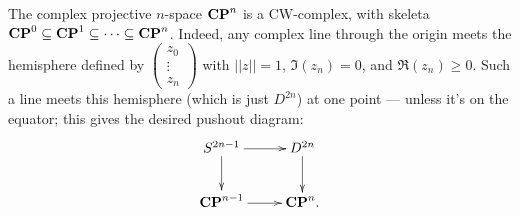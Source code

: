 \begin{example}
    The complex projective $n$-space $\mathbf{CP}^n$ is a CW-complex, with skeleta $\mathbf{CP}^0\subseteq\mathbf{CP}^1\subseteq\cdots\subseteq \mathbf{CP}^n$.
    Indeed, any complex line through the origin meets the hemisphere defined by
    $\begin{pmatrix}z_0\\\vdots\\z_n\end{pmatrix}$ with $||z||=1$, $\Im(z_n) = 0$, and $\Re(z_n)\geq 0$.
	Such a line meets this hemisphere (which is just $D^{2n}$) at one point --- unless it's on the equator;
	this gives the desired pushout diagram:
    \begin{equation*}
	\xymatrix{
	    S^{2n-1}\ar[r]\ar[d] & D^{2n}\ar[d]\\
	    \CP^{n-1}\ar[r] & \CP^n.
	    }
    \end{equation*}
\end{example}
